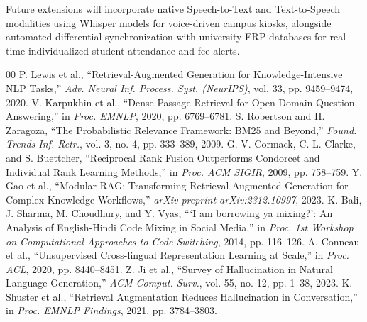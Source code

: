 \documentclass[conference]{IEEEtran}
\begin{document}
Future extensions will incorporate native Speech-to-Text and Text-to-Speech modalities using Whisper models for voice-driven campus kiosks, alongside automated differential synchronization with university ERP databases for real-time individualized student attendance and fee alerts.

\begin{thebibliography}{00}
 P. Lewis et al., ``Retrieval-Augmented Generation for Knowledge-Intensive NLP Tasks,'' \textit{Adv. Neural Inf. Process. Syst. (NeurIPS)}, vol. 33, pp. 9459--9474, 2020.
 V. Karpukhin et al., ``Dense Passage Retrieval for Open-Domain Question Answering,'' in \textit{Proc. EMNLP}, 2020, pp. 6769--6781.
 S. Robertson and H. Zaragoza, ``The Probabilistic Relevance Framework: BM25 and Beyond,'' \textit{Found. Trends Inf. Retr.}, vol. 3, no. 4, pp. 333--389, 2009.
 G. V. Cormack, C. L. Clarke, and S. Buettcher, ``Reciprocal Rank Fusion Outperforms Condorcet and Individual Rank Learning Methods,'' in \textit{Proc. ACM SIGIR}, 2009, pp. 758--759.
 Y. Gao et al., ``Modular RAG: Transforming Retrieval-Augmented Generation for Complex Knowledge Workflows,'' \textit{arXiv preprint arXiv:2312.10997}, 2023.
 K. Bali, J. Sharma, M. Choudhury, and Y. Vyas, ```I am borrowing ya mixing?': An Analysis of English-Hindi Code Mixing in Social Media,'' in \textit{Proc. 1st Workshop on Computational Approaches to Code Switching}, 2014, pp. 116--126.
 A. Conneau et al., ``Unsupervised Cross-lingual Representation Learning at Scale,'' in \textit{Proc. ACL}, 2020, pp. 8440--8451.
 Z. Ji et al., ``Survey of Hallucination in Natural Language Generation,'' \textit{ACM Comput. Surv.}, vol. 55, no. 12, pp. 1--38, 2023.
 K. Shuster et al., ``Retrieval Augmentation Reduces Hallucination in Conversation,'' in \textit{Proc. EMNLP Findings}, 2021, pp. 3784--3803.
\end{thebibliography}
\end{document}
